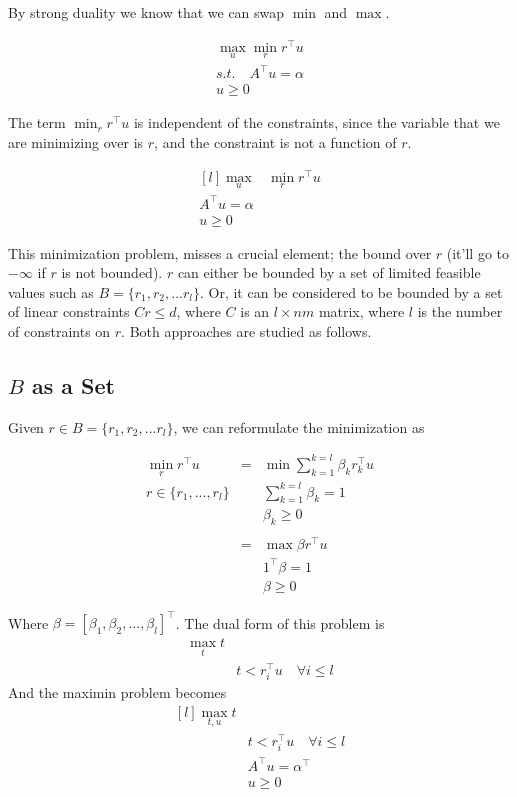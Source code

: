 \documentclass{article}
\theoremstyle{remark}
\theoremstyle{remark}
\theoremstyle{remark}
\theoremstyle{remark}
\theoremstyle{remark}
\theoremstyle{remark}
\begin{document}
By strong duality we know that we can swap $\min$ and $\max$.

$$
  \begin{matrix}
    \max_u \min_r r^\top  u \\
    s.t. \quad A^\top  u = \alpha \\
    u \geq 0
  \end{matrix}
$$

The term $\min_r r^\top  u$ is independent of the constraints, since the variable that we are minimizing over is $r$, and the constraint is not a function of $r$.

$$
  \begin{matrix*}[l]
    \max \limits_u & \min \limits_{r} r^\top u \\
    A^\top u = \alpha  & \\
    u \geq 0
  \end{matrix*}
$$

This minimization problem, misses a crucial element; the bound over $r$ (it'll go to $-\infty$ if $r$ is not bounded). $r$ can either be bounded by a set of limited feasible values such as $B=\{r_1, r_2,...r_l\}$. Or, it can be considered to be bounded by a set of linear constraints $Cr \leq d$, where $C$ is an $l \times nm$ matrix, where $l$ is the number of constraints on $r$. Both approaches are studied as follows.


\subsection*{$B$ as a Set}

Given $r \in B=\{r_1, r_2,...r_l\}$, we can reformulate the minimization as

$$
  \begin{matrix}
    \min_r r^\top u  &=& \min \sum_{k = 1}^{k=l} \beta_k r_k^\top u\\
    r \in \{r_1,...,r_l\} & & \sum_{k = 1}^{k=l} \beta_k = 1\\
      & & \beta_k \geq 0 \\
      & & \\
      & = &\max \beta r^\top u \\
      & & 1^\top \beta = 1 \\
      & & \beta \geq 0
  \end{matrix}
$$

Where $\beta = [\beta_1, \beta_2, ..., \beta_l]^\top$. The dual form of this problem is
\[
  \begin{matrix}
    \max_t t & \\
     & t < r_i^\top u \quad \forall i \leq l
  \end{matrix}
\]
And the maximin problem becomes
\[
  \begin{matrix*}[l]
    \max_{t,u} t & \\
     & t < r_i^\top u \quad \forall i \leq l\\
     & A^\top  u = \alpha^\top \\
     & u \geq 0 \\
  \end{matrix*}
\]
\end{document}
